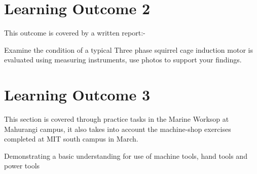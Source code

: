 \documentclass[11pt,a4paper]{article}
\begin{document}
\section{Learning Outcome 2}
\begin{tcolorbox}[colback=red!5!white,colframe=red!75!black,title=\textbf{Demonstrating the use of appropriate test equipment and accurately interpret results }]
This outcome is covered by a written report:-

Examine the condition of a typical Three phase squirrel cage induction motor is evaluated using measuring instruments, use photos to support your findings.
\end{tcolorbox}
\newpage

\newpage
\section{Learning Outcome 3}
\begin{tcolorbox}[colback=red!5!white,colframe=red!75!black,title=\textbf{Demonstrate basic knowledge of procedures for the conduct of repair and maintenance in accordance with manuals and good practice}]
This section is covered through practice tasks in the Marine Worksop at Mahurangi campus, it also takes into account the machine-shop exercises completed at MIT south campus in March.

Demonstrating a basic understanding for use of machine tools, hand tools and power tools
\end{tcolorbox}
\end{document}
